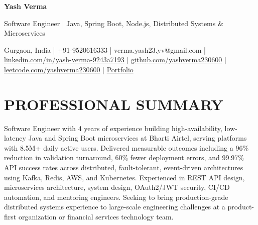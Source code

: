 \documentclass[10.5pt,letterpaper]{article}
\begin{document}
{\color{navy}\bfseries\fontsize{22}{24}\selectfont Yash Verma}\par\vspace{3pt}
{\color{greytxt}\large Software Engineer | Java, Spring Boot, Node.js, Distributed Systems \& Microservices}\par\vspace{2pt}
{\color{greytxt}\small Gurgaon, India | +91-9520616333 | verma.yash23.yv@gmail.com | \href{https://www.linkedin.com/in/yash-verma-9243a7193/}{linkedin.com/in/yash-verma-9243a7193} | \href{https://github.com/yashverma230600}{github.com/yashverma230600} | \href{https://leetcode.com/yashverma230600}{leetcode.com/yashverma230600} | \href{https://yashverma230600.github.io/yash-portfolio/}{Portfolio}}\par
\vspace{2pt}{\color{greytxt}\rule{\linewidth}{0.6pt}}

\section{PROFESSIONAL SUMMARY}
Software Engineer with 4 years of experience building high-availability, low-latency Java and Spring Boot microservices at Bharti Airtel, serving platforms with 8.5M+ daily active users. Delivered measurable outcomes including a 96\% reduction in validation turnaround, 60\% fewer deployment errors, and 99.97\% API success rates across distributed, fault-tolerant, event-driven architectures using Kafka, Redis, AWS, and Kubernetes. Experienced in REST API design, microservices architecture, system design, OAuth2/JWT security, CI/CD automation, and mentoring engineers. Seeking to bring production-grade distributed systems experience to large-scale engineering challenges at a product-first organization or financial services technology team.
\end{document}
